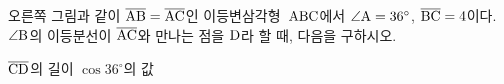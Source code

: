 \noindent\begin{minipage}[t]{0.58\linewidth}\vspace{0pt}\raggedright 오른쪽 그림과 같이 $\overline{\mathrm{AB}}=\overline{\mathrm{AC}}$인 이등변삼각형~$\mathrm{ABC}$에서 $\angle\mathrm{A}=36^\circ$, $\overline{\mathrm{BC}}=4$이다. $\angle\mathrm{B}$의 이등분선이 $\overline{\mathrm{AC}}$와 만나는 점을 $\mathrm{D}$라 할 때, 다음을 구하시오.\end{minipage}\hfill\begin{minipage}[t]{0.4\linewidth}\vspace{0pt}\centering \resizebox{\ifdim\width>\linewidth\linewidth\else\width\fi}{!}{}\end{minipage}\par
{} $\overline{\mathrm{CD}}$의 길이
 $\cos 36^\circ$의 값
